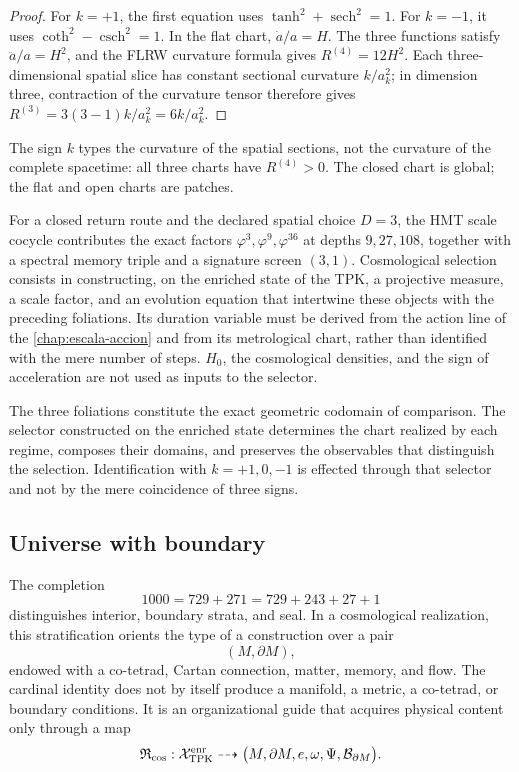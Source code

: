 \begin{proof}
For \(k=+1\), the first equation uses
\(\tanh^2+\operatorname{sech}^2=1\). For \(k=-1\), it uses
\(\coth^2-\operatorname{csch}^2=1\). In the flat chart,
\(\dot a/a=H\). The three functions satisfy
\(\ddot a/a=H^2\), and the FLRW curvature formula gives
\(R^{(4)}=12H^2\). Each three-dimensional spatial slice has constant sectional
curvature \(k/a_k^2\); in dimension three, contraction of the curvature tensor
therefore gives
\(R^{(3)}=3(3-1)k/a_k^2=6k/a_k^2\).
\end{proof}

The sign \(k\) types the curvature of the spatial sections, not the
curvature of the complete spacetime: all three charts have
\(R^{(4)}>0\). The closed chart is global; the flat and open charts are
patches.

\begin{statusbox}
    For a closed return route and the declared spatial choice \(D=3\), the HMT scale cocycle contributes the exact factors \(\varphi^3,\varphi^9,\varphi^{36}\) at depths \(9,27,108\), together with a spectral memory triple and a signature screen \((3,1)\). Cosmological selection consists in constructing, on the enriched state of the TPK, a projective measure, a scale factor, and an evolution equation that intertwine these objects with the preceding foliations. Its duration variable must be derived from the action line of the \cref{chap:escala-accion} and from its metrological chart, rather than identified with the mere number of steps. \(H_0\), the cosmological densities, and the sign of acceleration are not used as inputs to the selector.
\end{statusbox}

The three foliations constitute the exact geometric codomain of
comparison. The selector constructed on the enriched state determines the
chart realized by each regime, composes their domains, and preserves the
observables that distinguish the selection. Identification with
\(k=+1,0,-1\) is effected through that selector and not by the mere coincidence
of three signs.

\subsection{Universe with boundary}
\label{sec:universo-con-frontera-hmt}

The completion
\[
 1000=729+271=729+243+27+1
\]
distinguishes interior, boundary strata, and seal. In a cosmological
realization, this stratification orients the type of a construction over
a pair
\[
 (M,\partial M),
\]
endowed with a co-tetrad, Cartan connection, matter, memory, and flow. The
cardinal identity does not by itself produce a manifold, a metric, a
co-tetrad, or boundary conditions. It is an organizational guide that acquires
physical content only through a map
\[
 \mathfrak R_{\rm cos}:
 \mathcal X_{\rm TPK}^{\rm enr}
 \dashrightarrow
 \bigl(M,\partial M,e,\omega,\Psi,\mathcal B_{\partial M}\bigr).
\]

